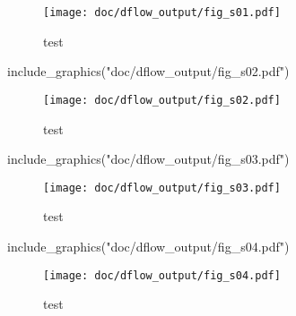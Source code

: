 \documentclass[
]{article}
\newenvironment{Shaded}{\begin{snugshade}}{\end{snugshade}}
\newcommand{\FunctionTok}[1]{\textcolor[rgb]{0.00,0.00,0.00}{#1}}
\newcommand{\NormalTok}[1]{#1}
\newcommand{\StringTok}[1]{\textcolor[rgb]{0.31,0.60,0.02}{#1}}
\begin{document}
\begin{figure}
\centering
\texttt{[image: doc/dflow\_output/fig\_s01.pdf]}
\caption{test}
\end{figure}

\begin{Shaded}
\begin{Highlighting}[]
\FunctionTok{include\_graphics}\NormalTok{(}\StringTok{"doc/dflow\_output/fig\_s02.pdf"}\NormalTok{)}
\end{Highlighting}
\end{Shaded}

\begin{figure}
\centering
\texttt{[image: doc/dflow\_output/fig\_s02.pdf]}
\caption{test}
\end{figure}

\begin{Shaded}
\begin{Highlighting}[]
\FunctionTok{include\_graphics}\NormalTok{(}\StringTok{"doc/dflow\_output/fig\_s03.pdf"}\NormalTok{)}
\end{Highlighting}
\end{Shaded}

\begin{figure}
\centering
\texttt{[image: doc/dflow\_output/fig\_s03.pdf]}
\caption{test}
\end{figure}

\begin{Shaded}
\begin{Highlighting}[]
\FunctionTok{include\_graphics}\NormalTok{(}\StringTok{"doc/dflow\_output/fig\_s04.pdf"}\NormalTok{)}
\end{Highlighting}
\end{Shaded}

\begin{figure}
\centering
\texttt{[image: doc/dflow\_output/fig\_s04.pdf]}
\caption{test}
\end{figure}
\end{document}
